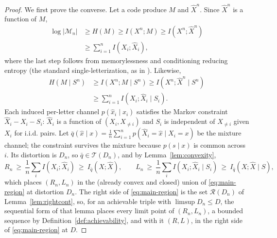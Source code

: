 \documentclass[11pt,onecolumn]{IEEEtran}
\newcommand{\hX}{\widehat{X}}
\newcommand{\hXn}{\widehat{X}^{n}}
\begin{document}
\begin{proof}
We first prove the converse. Let a code produce $M$ and $\hXn$. Since $\hXn$
is a function of $M$,
\begin{align}
 \log|\mathcal M_n|
 &\ge H(M)\ge I(X^n;M)\ge I(X^n;\hXn)\nonumber\\
 &\ge \sum_{i=1}^{n}I(X_i;\hX_i),
 \label{eq:rate-conv}
\end{align}
where the last step follows from memorylessness and conditioning reducing
entropy (the standard single-letterization, as in \cite{wynerziv1976}). Likewise,
\begin{align}
 H(M\mid S^n)
 &\ge I(X^n;M\mid S^n)
 \ge I(X^n;\hXn\mid S^n)\nonumber\\
 &\ge \sum_{i=1}^{n}I(X_i;\hX_i\mid S_i).
 \label{eq:work-conv}
\end{align}
Each induced per-letter channel $p(\hat x_i\mid x_i)$ satisfies the Markov
constraint $\hX_i-X_i-S_i$: $\hX_i$ is a function of $(X_i,X_{\ne i})$ and
$S_i$ is independent of $X_{\ne i}$ given $X_i$ for i.i.d. pairs. Let
$\bar q(\hat x\mid x)=\frac1n\sum_{i=1}^{n}p(\hX_i=\hat x\mid X_i=x)$ be
the mixture channel; the constraint survives the mixture because
$p(s\mid x)$ is common across $i$. Its distortion is $D_n$, so
$\bar q\in\mathcal T(D_n)$, and by Lemma~\ref{lem:convexity},
\begin{equation*}
 R_n\ \ge\ \frac1n\sum_i I(X_i;\hX_i)\ \ge\ I_{\bar q}(X;\hX),
 \qquad
 L_n\ \ge\ \frac1n\sum_i I(X_i;\hX_i\mid S_i)\ \ge\ I_{\bar q}(X;\hX\mid S),
\end{equation*}
which places $(R_n,L_n)$ in the (already convex and closed) union of
\eqref{eq:main-region} at distortion $D_n$. The right side of
\eqref{eq:main-region} is the set $\mathcal R(D_n)$ of
Lemma~\ref{lem:rightcont}, so, for an achievable triple with
$\limsup D_n\le D$, the sequential form of that lemma places every
limit point of $(R_n,L_n)$, a bounded sequence by
Definition~\ref{def:achievability}, and with it $(R,L)$, in the right side of
\eqref{eq:main-region} at $D$.


\end{proof}
\end{document}
